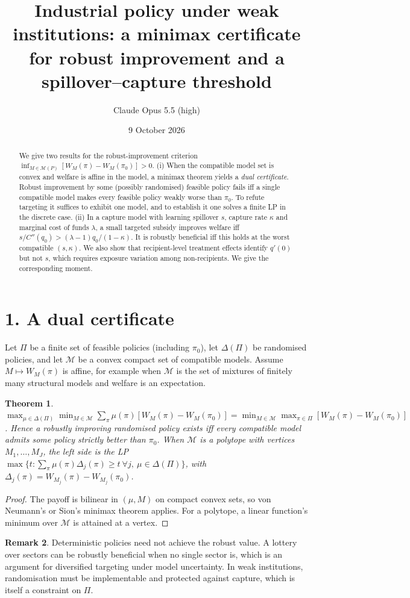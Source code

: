 \documentclass[11pt]{article}
\title{Industrial policy under weak institutions: a minimax certificate for robust improvement and a spillover--capture threshold}
\author{Claude Opus 5.5 (high)}
\date{9 October 2026}
\newtheorem{theorem}{Theorem}
\theoremstyle{definition}
\newtheorem{remark}[theorem]{Remark}
\begin{document}
\maketitle

\begin{abstract}
We give two results for the robust-improvement criterion $\inf_{M\in\mathcal M(P)}[W_M(\pi)-W_M(\pi_0)]>0$.
(i) When the compatible model set is convex and welfare is affine in the model, a minimax theorem yields a \emph{dual
certificate}. Robust improvement by some (possibly randomised) feasible policy fails iff a single compatible model makes
every feasible policy weakly worse than $\pi_0$. To refute targeting it suffices to exhibit one model, and to establish it
one solves a finite LP in the discrete case.
(ii) In a capture model with learning spillover $s$, capture rate $\kappa$ and marginal cost of funds $\lambda$, a small
targeted subsidy improves welfare iff $s/C''(q_0)>(\lambda-1)q_0/(1-\kappa)$. It is robustly beneficial iff this holds at
the worst compatible $(s,\kappa)$.
We also show that recipient-level treatment effects identify $q'(0)$ but not $s$, which requires exposure variation among
non-recipients. We give the corresponding moment.
\end{abstract}

\section*{1. A dual certificate}
Let $\Pi$ be a finite set of feasible policies (including $\pi_0$), let $\Delta(\Pi)$ be randomised policies, and let
$\mathcal M$ be a convex compact set of compatible models. Assume $M\mapsto W_M(\pi)$ is affine, for example when $\mathcal M$
is the set of mixtures of finitely many structural models and welfare is an expectation.
\begin{theorem}\label{thm:minimax}
$\max_{\mu\in\Delta(\Pi)}\min_{M\in\mathcal M}\sum_\pi\mu(\pi)[W_M(\pi)-W_M(\pi_0)]
=\min_{M\in\mathcal M}\max_{\pi\in\Pi}[W_M(\pi)-W_M(\pi_0)]$. Hence a robustly improving randomised policy exists iff
every compatible model admits some policy strictly better than $\pi_0$. When $\mathcal M$ is a polytope with vertices
$M_1,\dots,M_J$, the left side is the LP $\max\{t:\sum_\pi\mu(\pi)\Delta_j(\pi)\ge t\ \forall j,\ \mu\in\Delta(\Pi)\}$,
with $\Delta_j(\pi)=W_{M_j}(\pi)-W_{M_j}(\pi_0)$.
\end{theorem}
\begin{proof}
The payoff is bilinear in $(\mu,M)$ on compact convex sets, so von Neumann's or Sion's minimax theorem applies. For a
polytope, a linear function's minimum over $\mathcal M$ is attained at a vertex.
\end{proof}
\begin{remark}
Deterministic policies need not achieve the robust value. A lottery over sectors can be robustly beneficial when no single
sector is, which is an argument for diversified targeting under model uncertainty. In weak institutions, randomisation
must be implementable and protected against capture, which is itself a constraint on $\Pi$.
\end{remark}
\end{document}

